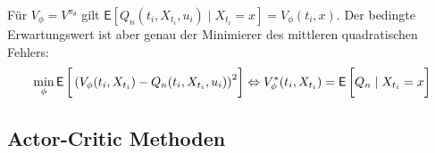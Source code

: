 \documentclass[a4paper, 12pt]{scrartcl}
\begin{document}
\begin{beweis}
\begin{itemize}
        Für $V_\phi = V^{\pi_{\theta}}$ gilt 
        $\mathsf{E}\left[Q_n(t_i , X_{t_i}, u_i)\mid X_{t_i}= x \right] = V_\phi (t_i,x)$.
        Der bedingte Erwartungswert ist aber 
        genau der Minimierer des mittleren quadratischen Fehlers:
        \begin{align*}
            \min_{\phi}
            \mathsf{E}
            \left[
                \vphantom{\int}
                \left(
                    V_{\phi}(t_i , X_{t_i})
                    -
                    Q_n(t_i , X_{t_i}, u_i)
                \right)^2
            \right]
            \Leftrightarrow
            V_{\phi}^{*} (t_i , X_{t_i}) 
            =
            \mathsf{E}
            \left[
                \vphantom{\int}
                Q_n
                \mid
                X_{t_i}= x
            \right]
        \end{align*}
    \end{itemize}
\end{beweis}
%
\subsection{Actor-Critic Methoden}
\end{document}
